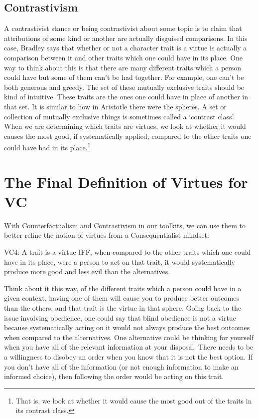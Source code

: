 \subsection{Contrastivism}

A contrastivist stance or being contrastivist about some topic is to claim that attributions of some kind or another are actually disguised comparisons. In this case, Bradley says that whether or not a character trait is a virtue is actually a comparison between it and other traits which one could have in its place. One way to think about this is that there are many different traits which a person could have but some of them can’t be had together. For example, one can’t be both generous and greedy. The set of these mutually exclusive traits should be kind of intuitive. These traits are the ones one could have in place of another in that set. It is similar to how in Aristotle there were the spheres. A set or collection of mutually exclusive things is sometimes called a `contrast class'. When we are determining which traits are virtues, we look at whether it would causes the most good, if systematically applied, compared to the other traits one could have had in its place.\footnote{That is, we look at whether it would cause the most good out of the traits in its contrast class.}  

\section{The Final Definition of Virtues for VC}

With Counterfactualism and Contrastivism in our toolkits, we can use them to better refine the notion of virtues from a Consequentialist mindset:

\begin{center}
VC4: A trait is a virtue IFF, when compared to the other traits which one could have in its place, were a person to act on that trait, it would systematically produce more good and less evil than the alternatives. 
\end{center}

Think about it this way, of the different traits which a person could have in a given context, having one of them will cause you to produce better outcomes than the others, and that trait is the virtue in that sphere. Going back to the issue involving obedience, one could say that blind obedience is not a virtue because systematically acting on it would not always produce the best outcomes when compared to the alternatives. One alternative could be thinking for yourself when you have all of the relevant information at your disposal. There needs to be a willingness to disobey an order when you know that it is not the best option. If you don't have all of the information (or not enough information to make an informed choice), then following the order would be acting on this trait.  

